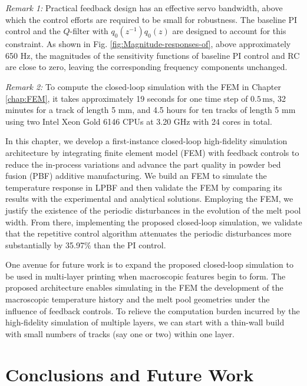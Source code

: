 \documentclass [11pt, proquest] {uwthesis}[2020/02/24]
\begin{document}
\emph{Remark 1:} Practical feedback design has an effective servo
bandwidth, above which the control efforts are required to be small
for robustness. The baseline PI control and the $Q$-filter with $q_{0}(z^{-1})q_{0}(z)$
are designed to account for this constraint. As shown in Fig. \ref{fig:Magnitude-responses-of},
above approximately 650 Hz, the magnitudes of the sensitivity functions
of baseline PI control and RC are close to zero, leaving the corresponding
frequency components unchanged.

\emph{Remark 2: }To compute the closed-loop simulation with the FEM
in Chapter \ref{chap:FEM}, it takes approximately
19 seconds for one time step of $0.5\,\text{ms}$, 32 minutes for
a track of length 5 mm, and 4.5 hours for ten tracks of length 5 mm
using two Intel Xeon Gold 6146 CPUs at 3.20 GHz with 24 cores in total.


In this chapter, we develop a first-instance closed-loop high-fidelity
simulation architecture by integrating finite element model (FEM)
with feedback controls to reduce the in-process variations and advance
the part quality in powder bed fusion (PBF) additive manufacturing.
We build an FEM to simulate the temperature response in LPBF and then
validate the FEM by comparing its results with the experimental and
analytical solutions. Employing the FEM, we justify the existence
of the periodic disturbances in the evolution of the melt pool width.
From there, implementing the proposed closed-loop simulation, we validate
that the repetitive control algorithm attenuates the periodic disturbances
more substantially by 35.97\% than the PI control.

One avenue for future work is to expand the proposed closed-loop simulation
to be used in multi-layer printing when macroscopic features begin
to form. The proposed architecture enables simulating in the FEM the
development of the macroscopic temperature history and the melt pool
geometries under the influence of feedback controls. To relieve the
computation burden incurred by the high-fidelity simulation of multiple
layers, we can start with a thin-wall build with small numbers of
tracks (say one or two) within one layer.


 
\chapter{Conclusions and Future Work} \label{chap:Conclusions}

%
%


%
%
\appendix
\raggedbottom\sloppy
 
\end{document}
